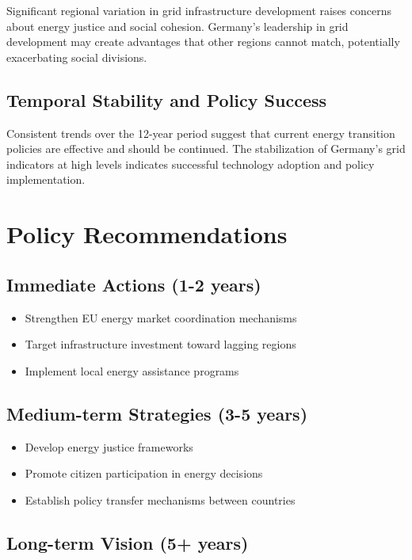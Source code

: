 \documentclass[11pt,a4paper]{article}
\begin{document}
Significant regional variation in grid infrastructure development raises concerns about energy justice and social cohesion. Germany's leadership in grid development may create advantages that other regions cannot match, potentially exacerbating social divisions.

\subsection{Temporal Stability and Policy Success}

Consistent trends over the 12-year period suggest that current energy transition policies are effective and should be continued. The stabilization of Germany's grid indicators at high levels indicates successful technology adoption and policy implementation.

\section{Policy Recommendations}

\subsection{Immediate Actions (1-2 years)}

\begin{itemize}
\item Strengthen EU energy market coordination mechanisms
\item Target infrastructure investment toward lagging regions
\item Implement local energy assistance programs
\end{itemize}

\subsection{Medium-term Strategies (3-5 years)}

\begin{itemize}
\item Develop energy justice frameworks
\item Promote citizen participation in energy decisions
\item Establish policy transfer mechanisms between countries
\end{itemize}

\subsection{Long-term Vision (5+ years)}
\end{document}
